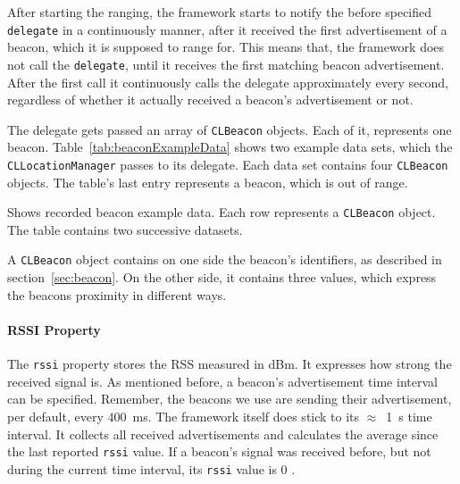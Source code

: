 After starting the ranging, the framework starts to notify the before specified \texttt{delegate} in a continuously manner, after it received the first advertisement of a beacon, which it is supposed to range for. This means that, the framework does not call the \texttt{delegate}, until it receives the first matching beacon advertisement. After the first call it continuously calls the delegate approximately every second, regardless of whether it actually received a beacon's advertisement or not.

The delegate gets passed an array of \texttt{CLBeacon} objects. Each of it, represents one beacon. Table~\ref{tab:beaconExampleData} shows two example data sets, which the \texttt{CLLocationManager} passes to its delegate. Each data set contains four \texttt{CLBeacon} objects. The table's last entry represents a beacon, which is out of range.

\begin{table}
	
	\caption{Shows recorded beacon example data. Each row represents a \texttt{CLBeacon} object. The table contains two successive datasets.}
	\label{tab:beaconExampleData}
\end{table}

A \texttt{CLBeacon} object contains on one side the beacon's identifiers, as described in section~\ref{sec:beacon}. On the other side, it contains three values, which express the beacons proximity in different ways.

\paragraph{\acs{RSSI} Property} The \texttt{rssi} property stores the \acl{RSS} measured in dBm. It expresses how strong the received signal is. As mentioned before, a beacon's advertisement time interval can be specified. Remember, the beacons we use are sending their advertisement, per default, every $400$~ms. The framework itself does stick to its $\approx$~1~s time interval. It collects all received advertisements and calculates the average since the last reported \texttt{rssi} value. If a beacon's signal was received before, but not during the current time interval, its \texttt{rssi} value is 0 \citep{apple:wwdc_2013_bruins,apple:ios_doc_cl}.

